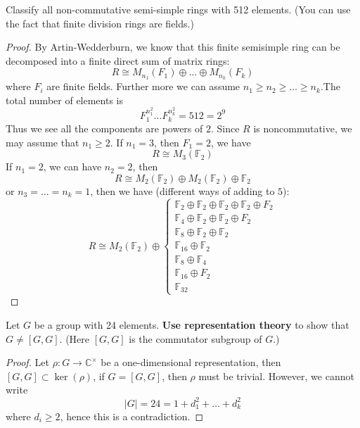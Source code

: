 \documentclass[openany]{book}
\newcommand{\C}{\mathbb{C}}
\newcommand{\F}{\mathbb{F}}
\begin{document}
\begin{prob}
    Classify all non-commutative semi-simple rings with 512 elements. (You can use the fact that finite division rings are fields.)
\end{prob}
\begin{proof}
    By Artin-Wedderburn, we know that this finite semisimple ring can be decomposed into a finite direct sum of matrix rings:
    \begin{equation*}
        R\cong M_{n_1}(F_1)\oplus\dots\oplus M_{n_k}(F_k)
    \end{equation*}
    where $F_i$ are finite fields. Further more we can assume $n_1\geq n_2\geq\dots\geq n_k$.The total number of elements is 
    \begin{equation*}
        F_1^{n_1^2}\dots F_k^{n_k^2}=512=2^9
    \end{equation*}
    Thus we see all the components are powers of $2$. Since $R$ is noncommutative, we may assume that $n_1\geq 2$. If $n_1=3$, then $F_1=2$, we have 
    \begin{equation*}
        R\cong M_{3}(\F_2)
    \end{equation*}
    If $n_1=2$, we can have $n_2=2$, then 
    \begin{equation*}
        R\cong M_2(\F_2)\oplus M_2(\F_2)\oplus \F_2
    \end{equation*}
    or $n_3=\dots=n_k=1$, then we have (different ways of adding to $5$):
    \begin{equation*}
        R\cong M_2(\F_2)\oplus\begin{cases}
            \F_2\oplus\F_2\oplus\F_2\oplus\F_2\oplus F_2\\
            \F_{4}\oplus \F_2\oplus\F_2\oplus F_2\\
            \F_8\oplus\F_2\oplus\F_2\\
            \F_{16}\oplus\F_2\\
            \F_8\oplus\F_4\\
            \F_{16}\oplus F_2\\
            \F_{32}
        \end{cases}
    \end{equation*}
\end{proof}


\begin{prob}
    Let \(G\) be a group with 24 elements. \textbf{Use representation theory} to show that \(G \neq [G, G]\). (Here \([G, G]\) is the commutator subgroup of \(G\).)
\end{prob}
\begin{proof}
    Let $\rho:G\to\C^\times$ be a one-dimensional representation, then $[G,G]\subset\ker(\rho)$, if $G=[G,G]$, then $\rho$ must be trivial. However, we cannot write 
    \begin{equation*}
        |G|=24=1+d_1^2+\dots+d_k^2
    \end{equation*}
    where $d_i\geq 2$, hence this is a contradiction.
\end{proof}
\end{document}

